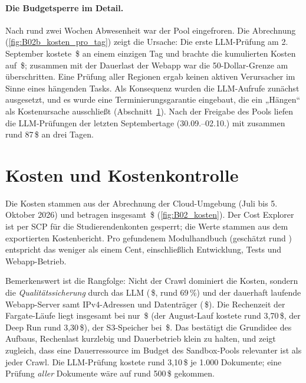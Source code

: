 \paragraph{Die Budgetsperre im Detail.} Nach rund zwei Wochen Abwesenheit war der Pool eingefroren. Die Abrechnung (\cref{fig:B02b_kosten_pro_tag}) zeigt die Ursache: Die erste LLM-Prüfung am 2.\,September kostete \zKostenSepTag{}\,\$ an einem einzigen Tag und brachte die kumulierten Kosten auf \zKostenSepKum{}\,\$; zusammen mit der Dauerlast der Webapp war die 50-Dollar-Grenze am \zKostenTagGrenze{} überschritten. Eine Prüfung aller Regionen ergab keinen aktiven Verursacher im Sinne eines hängenden Tasks. Als Konsequenz wurden die LLM-Aufrufe zunächst ausgesetzt, und es wurde eine Terminierungsgarantie eingebaut, die ein „Hängen“ als Kostenursache ausschließt (Abschnitt~\ref{sec:aws-kosten}). Nach der Freigabe des Pools liefen die LLM-Prüfungen der letzten Septembertage (30.09.--02.10.) mit zusammen rund 87\,\$ an drei Tagen.

\section{Kosten und Kostenkontrolle}\label{sec:aws-kosten}
Die Kosten stammen aus der Abrechnung der Cloud-Umgebung (Juli bis 5.\,Oktober 2026) und betragen insgesamt \zKostenGesamt{}\,\$ (\cref{fig:B02_kosten}). Der Cost Explorer ist per SCP für die Studierendenkonten gesperrt; die Werte stammen aus dem exportierten Kostenbericht. Pro gefundenem Modulhandbuch (geschätzt rund \zEstTrue{}) entspricht das weniger als einem Cent, einschließlich Entwicklung, Tests und Webapp-Betrieb.


Bemerkenswert ist die Rangfolge: Nicht der Crawl dominiert die Kosten, sondern die \emph{Qualitätssicherung} durch das LLM (\zKostenBedrock{}\,\$, rund 69\,\%) und der dauerhaft laufende Webapp-Server samt IPv4-Adressen und Datenträger (\zKostenEc{}\,\$). Die Rechenzeit der Fargate-Läufe liegt insgesamt bei nur \zKostenFargate{}\,\$ (der August-Lauf kostete rund 3,70\,\$, der Deep Run rund 3,30\,\$), der S3-Speicher bei \zKostenSpeicher{}\,\$. Das bestätigt die Grundidee des Aufbaus, Rechenlast kurzlebig und Dauerbetrieb klein zu halten, und zeigt zugleich, dass eine Dauerressource im Budget des Sandbox-Pools relevanter ist als jeder Crawl. Die LLM-Prüfung kostete rund 3,10\,\$ je 1.000 Dokumente; eine Prüfung \emph{aller} Dokumente wäre auf rund 500\,\$ gekommen.

